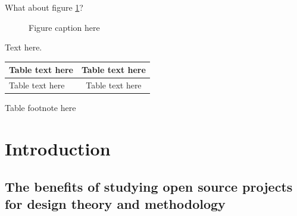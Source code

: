 \documentclass{ICED-Paper}%
\begin{document}

What about figure \ref{fig1}?

\begin{figure}
\caption{Figure caption here\label{fig1}}
\end{figure}

Text here.

\begin{table}
{\tabcolsep=2pc\begin{tabular}{|l|c|}%
\hline
Table text here & Table text here\\%
\hline
Table text here & Table text here\\%
\hline
\end{tabular}}{Table footnote here}
\end{table}

\section{Introduction}

\subsection{The benefits of studying open source projects for design theory and methodology} 
\end{document}
